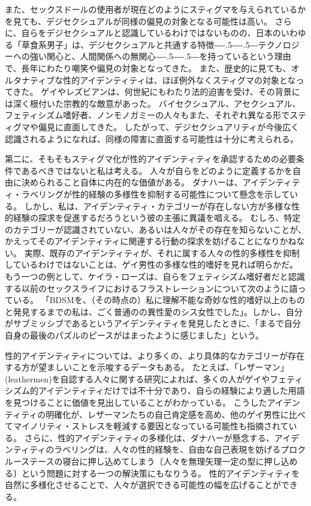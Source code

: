 \documentclass[paper=a4,book,openany]{jlreq}
\def\DDASH{―\kern-.5\zw―\kern-.5\zw―}
\begin{document}
また、セックスドールの使用者が現在どのようにスティグマを与えられているかを見ても、デジセクシュアルが同様の偏見の対象となる可能性は高い\citep{knox17:_sex_dolls}。
さらに、自らをデジセクシュアルと認識しているわけではないものの、日本のいわゆる「草食系男子」は、デジセクシュアルと共通する特徴{\DDASH}テクノロジーへの強い関心と、人間関係への無関心{\DDASH}を持っているという理由で、長年にわたり嘲笑や偏見の対象となってきた\citep{harney09:_herbiv_dilem}。
また、歴史的に見ても、オルタナティブな性的アイデンティティは、ほぼ例外なくスティグマの対象となってきた。
ゲイやレズビアンは、何世紀にもわたり法的迫害を受け、その背景には深く根付いた宗教的な敵意があった。
バイセクシュアル、アセクシュアル、フェティシズム嗜好者、ノンモノガミーの人々もまた、それぞれ異なる形でスティグマや偏見に直面してきた\citep{klein06:_sm_sadom_inter_issue_child_custod_proceed,wright06:_discr_sm_ident_indiv,balzarini18:_dimmin_halo_aroun_monog,rothblum20:_asexual_non_asexual_respon_u}。
したがって、デジセクシュアリティが今後広く認識されるようになれば、同様の障害に直面する可能性は十分に考えられる。

第二に、そもそもスティグマ化が性的アイデンティティを承認するための必要条件であるべきではないと私は考える。
人々が自らをどのように定義するかを自由に決められること自体に内在的な価値がある。
ダナハーは、アイデンティティ・ラベリングが性的経験の多様性を抑制する可能性について懸念を示している。
しかし、私は、アイデンティティ・カテゴリーが存在しない方が多様な性的経験の探求を促進するだろうという彼の主張に異議を唱える。
むしろ、特定のカテゴリーが認識されていない、あるいは人々がその存在を知らないことが、かえってそのアイデンティティに関連する行動の探求を妨げることになりかねない。
実際、既存のアイデンティティが、それに属する人々の性的多様性を抑制しているわけではないことは、ゲイ男性の多様な性的嗜好を見れば明らかだ。
もう一つの例として、ケイラ・ローズは、自らをフェティシズム嗜好者だと認識する以前のセックスライフにおけるフラストレーションについて次のように語っている。
「BDSMを、（その時点の）私に理解不能な奇妙な性的嗜好以上のものと発見するまでの私は、ごく普通のの異性愛のシス女性でした」。しかし、自分がサブミッシブであるというアイデンティティを発見したときに、「まるで自分自身の最後のパズルのピースがはまったように感じました」という\citep{lords:sexual_submission}。

性的アイデンティティについては、より多くの、より具体的なカテゴリーが存在する方が望ましいことを示唆するデータもある。
たとえば、「レザーマン」(leathermen)を自認する人々に関する研究によれば、多くの人がゲイやフェティシズム的アイデンティティだけでは不十分であり、自らの経験により適した用語を見つけることに価値を見出していることがわかっている\citep{kamel80:_leath}。
こうしたアイデンティティの明確化が、レザーマンたちの自己肯定感を高め、他のゲイ男性に比べてマイノリティ・ストレスを軽減する要因となっている可能性も指摘されている\citep{mosher16:_layer_leath,tatum16:_proxim_minor_stres_proces_subjec}。
さらに、性的アイデンティティの多様化は、ダナハーが懸念する、アイデンティティのラベリングは、人々の性的経験を、自由な自己表現を妨げるプロクルーステースの寝台に押し込めてしまう〔人々を無理矢理一定の型に押し込める〕という問題に対する一つの解決策にもなりうる。
性的アイデンティティを自然に多様化させることで、人々が選択できる可能性の幅を広げることができる。
\end{document}
